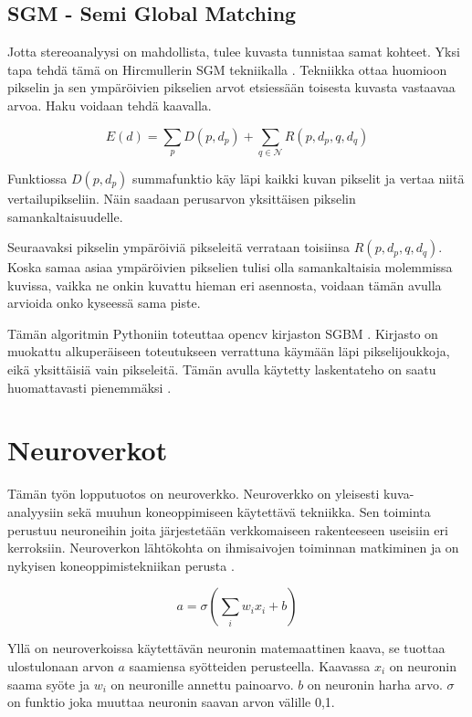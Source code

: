 \subsection{SGM - Semi Global Matching}

Jotta stereoanalyysi on mahdollista,
tulee kuvasta tunnistaa samat kohteet.
Yksi tapa tehdä tämä on Hircmullerin SGM tekniikalla \cite{hirschmuller2005babel}.
Tekniikka ottaa huomioon pikselin ja sen ympäröivien pikselien arvot etsiessään toisesta kuvasta vastaavaa arvoa. Haku voidaan tehdä kaavalla.

\begin{equation}\label{yht:SGM}
    E(d) = \sum_{p} D(p, d_p) + \sum_{q \in \mathcal{N}} R(p, d_p, q, d_q)
\end{equation}

Funktiossa \(D(p, d_p)\) summafunktio käy läpi kaikki kuvan pikselit ja vertaa niitä vertailupikseliin.
Näin saadaan perusarvon yksittäisen pikselin samankaltaisuudelle.

Seuraavaksi pikselin ympäröiviä pikseleitä verrataan toisiinsa \(R(p, d_p, q, d_q)\).
Koska samaa asiaa ympäröivien pikselien tulisi olla samankaltaisia molemmissa kuvissa,
vaikka ne onkin kuvattu hieman eri asennosta, voidaan tämän avulla arvioida onko kyseessä sama piste.

Tämän algoritmin Pythoniin toteuttaa opencv kirjaston SGBM \cite{opencvsgbm}.
Kirjasto on muokattu alkuperäiseen toteutukseen verrattuna käymään läpi pikselijoukkoja, eikä yksittäisiä vain pikseleitä.
Tämän avulla käytetty laskentateho on saatu huomattavasti pienemmäksi \cite{MemoryEfficientSGM}.

\section{Neuroverkot} 

Tämän työn lopputuotos on neuroverkko.
Neuroverkko on yleisesti kuva-analyysiin sekä muuhun koneoppimiseen käytettävä tekniikka.
Sen toiminta perustuu neuroneihin joita järjestetään verkkomaiseen rakenteeseen useisiin eri kerroksiin.
Neuroverkon lähtökohta on ihmisaivojen toiminnan matkiminen ja on nykyisen koneoppimistekniikan perusta \cite{PhamTrungQuang2023EotH}.


\begin{equation}\label{yht:neuroni}
    a = \sigma\left(\sum_i w_i x_i + b\right)
\end{equation}

Yllä on neuroverkoissa käytettävän neuronin matemaattinen kaava,
se tuottaa ulostulonaan arvon \(a\) saamiensa syötteiden perusteella.
Kaavassa \(x_i\) on neuronin saama syöte ja
\(w_i\) on neuronille annettu painoarvo.
\(b\) on neuronin harha arvo. \(\sigma\) on funktio joka muuttaa neuronin saavan arvon välille 0,1.


